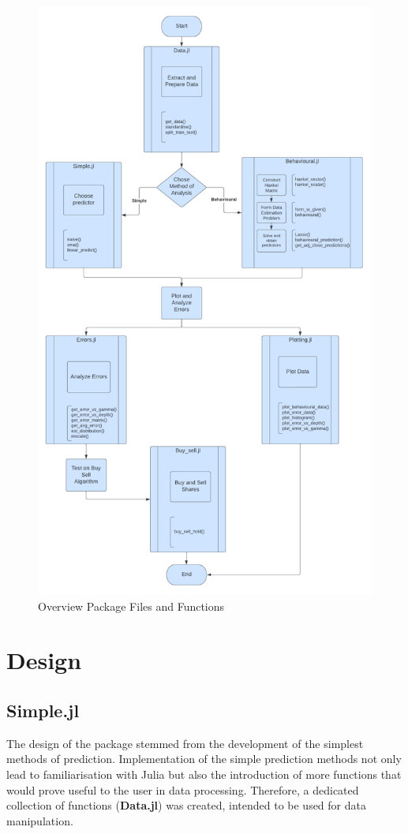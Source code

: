 \begin{figure}
    \centering
    \includegraphics[width=0.9\columnwidth]{Analysis_and_Design/Airbone_diagram.png}
    \caption{Overview Package Files and Functions}
    \label{fig: package_flow}
\end{figure}

\section{Design}

\subsection{Simple.jl}
The design of the package stemmed from the development of the simplest methods of prediction. Implementation of the simple prediction methods not only lead to familiarisation with Julia but also the introduction of more functions that would prove useful to the user in data processing. Therefore, a dedicated collection of functions (\textbf{Data.jl}) was created, intended to be used for data manipulation.

